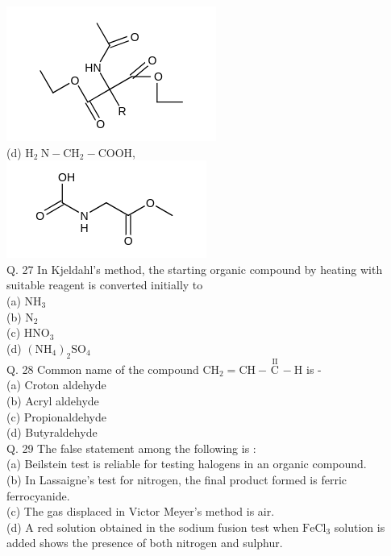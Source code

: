 \documentclass[10pt]{article}
\begin{document}
\includegraphics{smile-19f33f8a8290b34a417a8a42964a0c79adfcf537}\\
(d) $\mathrm{H}_{2} \mathrm{~N}-\mathrm{CH}_{2}-\mathrm{COOH}$,\\
\includegraphics{smile-6d7abf6b5ac4a636ef8c805df0412063ab1331e0}\\
Q. 27 In Kjeldahl's method, the starting organic compound by heating with suitable reagent is converted initially to\\
(a) $\mathrm{NH}_{3}$\\
(b) $\mathrm{N}_{2}$\\
(c) $\mathrm{HNO}_{3}$\\
(d) $\left(\mathrm{NH}_{4}\right)_{2} \mathrm{SO}_{4}$\\
Q. 28 Common name of the compound $\mathrm{CH}_{2}=\mathrm{CH}-\stackrel{\text { II }}{\mathrm{C}}-\mathrm{H}$ is -\\
(a) Croton aldehyde\\
(b) Acryl aldehyde\\
(c) Propionaldehyde\\
(d) Butyraldehyde\\
Q. 29 The false statement among the following is :\\
(a) Beilstein test is reliable for testing halogens in an organic compound.\\
(b) In Lassaigne's test for nitrogen, the final product formed is ferric ferrocyanide.\\
(c) The gas displaced in Victor Meyer's method is air.\\
(d) A red solution obtained in the sodium fusion test when $\mathrm{FeCl}_{3}$ solution is added shows the presence of both nitrogen and sulphur.\\
\end{document}

